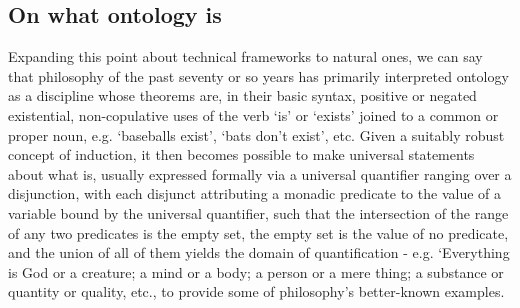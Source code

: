 \documentclass[]{article}
\begin{document}
\subsection{On what ontology is}
Expanding this point about technical frameworks to natural ones,
we can say that 
philosophy of the past seventy or so years has primarily interpreted ontology 
as a discipline whose theorems are, 
in their basic syntax, 
positive or negated existential, non-copulative uses of the verb `is' or `exists' joined to a common or proper noun, 
e.g. `baseballs exist', `bats don't exist', etc. 
Given a suitably robust concept of induction, it then becomes possible to make universal statements about what is, 
usually expressed formally via a universal quantifier ranging over a disjunction, 
with each disjunct
attributing a monadic predicate to the value of a variable bound by the universal
quantifier, 
such that 
the intersection of the range of any two predicates is the empty set, 
the empty set is the value of no predicate, 
and the union of all of them
yields the domain of quantification - 
e.g. `Everything is God or a creature; 
a mind or a body; 
a person or a mere thing; 
a substance or quantity or quality, etc., 
to provide some of philosophy's better-known examples. 
\end{document}
